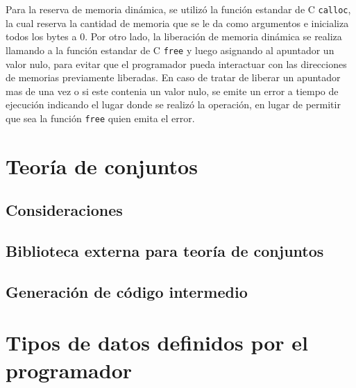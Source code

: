 Para la reserva de memoria dinámica, se utilizó la función estandar de C
\texttt{calloc}, la cual reserva la cantidad de memoria que se le da como
argumentos e inicializa todos los bytes a 0. Por otro lado, la liberación de
memoria dinámica se realiza llamando a la función estandar de C \texttt{free} y
luego asignando al apuntador un valor nulo, para evitar que el programador pueda
interactuar con las direcciones de memorias previamente liberadas. En caso de
tratar de liberar un apuntador mas de una vez o si este contenia un valor nulo,
se emite un error a tiempo de ejecución indicando el lugar donde se realizó la
operación, en lugar de permitir que sea la función \texttt{free} quien emita el
error.

\section{Teoría de conjuntos}
\subsection{Consideraciones}
\blindtext[1]

\subsection{Biblioteca externa para teoría de conjuntos}
\blindtext[1]

\subsection{Generación de código intermedio}
\blindtext[1]

\section{Tipos de datos definidos por el programador}

